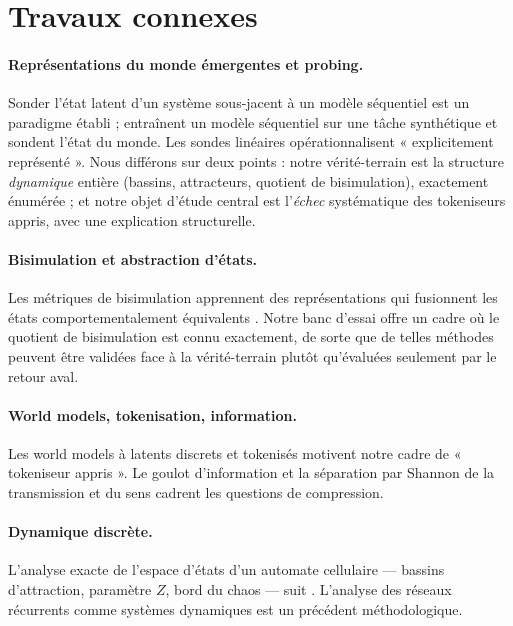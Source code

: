 \documentclass[11pt]{article}
\begin{document}
\section{Travaux connexes}
\label{sec:related}

\paragraph{Représentations du monde émergentes et probing.}
Sonder l'état latent d'un système sous-jacent à un modèle séquentiel est un
paradigme établi ; \citet{li2023emergent} entraînent un modèle séquentiel sur
une tâche synthétique et sondent l'état du monde. Les sondes linéaires
\citep{alain2016probes} opérationnalisent « explicitement représenté ». Nous
différons sur deux points : notre vérité-terrain est la structure
\emph{dynamique} entière (bassins, attracteurs, quotient de bisimulation),
exactement énumérée ; et notre objet d'étude central est l'\emph{échec}
systématique des tokeniseurs appris, avec une explication structurelle.

\paragraph{Bisimulation et abstraction d'états.}
Les métriques de bisimulation apprennent des représentations qui fusionnent les
états comportementalement équivalents \citep{zhang2021dbc,castro2021mico}. Notre
banc d'essai offre un cadre où le quotient de bisimulation est connu
exactement, de sorte que de telles méthodes peuvent être validées face à la
vérité-terrain plutôt qu'évaluées seulement par le retour aval.

\paragraph{World models, tokenisation, information.}
Les world models à latents discrets et tokenisés \citep{vandenoord2017vqvae,
hafner2023dreamerv3} motivent notre cadre de « tokeniseur appris ». Le goulot
d'information \citep{tishby1999ib} et la séparation par Shannon de la
transmission et du sens \citep{shannon1948} cadrent les questions de
compression.

\paragraph{Dynamique discrète.}
L'analyse exacte de l'espace d'états d'un automate cellulaire --- bassins
d'attraction, paramètre $Z$, bord du chaos --- suit \citet{wuensche1999z}.
L'analyse des réseaux récurrents comme systèmes dynamiques
\citep{sussillo2013blackbox} est un précédent méthodologique.
\end{document}
